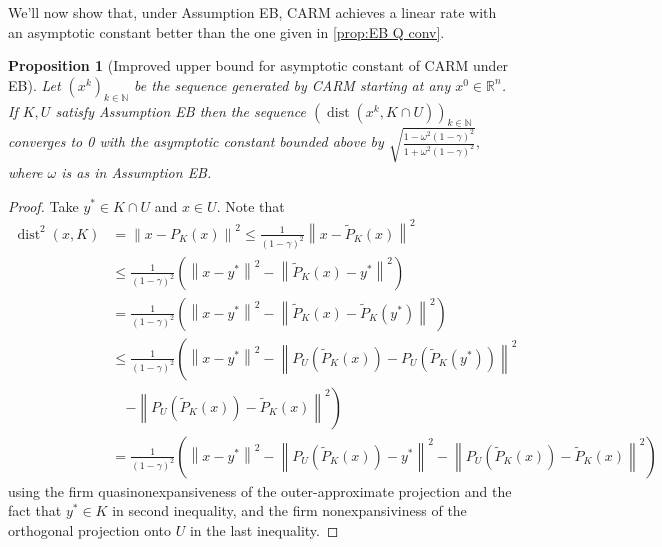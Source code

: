 \documentclass[smallextended,numbook,nospthms]{svjour3}
\theoremstyle{plain}
\newtheorem{proposition}[theorem]{Proposition}
\theoremstyle{definition}
\def\RR{\mathds R}
\def\NN{\mathds N}
\DeclareMathOperator{\dist}{dist}
\begin{document}
We'll now show that, under Assumption EB, CARM achieves a linear rate with an asymptotic constant better than the one given in \cref{prop:EB Q conv}.
\begin{proposition}[Improved upper bound for asymptotic constant of CARM under EB]\label{prop:CARM linear rate}
	Let $\left(x^{k}\right)_{k \in \NN}$ be the sequence generated by CARM starting at any $x^{0} \in \RR^{n}$. If $K, U$ satisfy Assumption EB then the sequence $\left(\dist\left(x^{k}, K \cap U\right)\right)_{k \in \NN}$ converges to 0 with the asymptotic constant bounded above by $\sqrt{\frac{1-\omega^{2}(1-\gamma)^2}{1+\omega^{2}(1-\gamma)^2}},$ where $\omega$ is as in Assumption EB.
\end{proposition}
\begin{proof}
	Take $y^{*} \in K \cap U$ and $x \in U$. Note that
	\begin{align}
		\dist^{2}(x, K) &=\left\|x-P_{K}(x)\right\|^{2}\leq \frac{1}{(1-\gamma)^2}\left\|x-\tilde{P}_{K}(x)\right\|^{2}  \\
		& \leq\frac{1}{(1-\gamma)^2}\left(\left\|x-y^{*}\right\|^{2}-\left\|\tilde{P}_{K}(x)-y^{*}\right\|^{2}\right) \\
		&=\frac{1}{(1-\gamma)^2}\left(\left\|x-y^{*}\right\|^{2}-\left\|\tilde{P}_{K}(x)-\tilde{P}_{K}\left(y^{*}\right)\right\|^{2}\right)  \\
		& \leq\frac{1}{(1-\gamma)^2}\left(\left\|x-y^{*}\right\|^{2}-\left\|P_{U}\left(\tilde{P}_{K}(x)\right)-P_{U}\left(\tilde{P}_{K}\left(y^{*}\right)\right)\right\|^{2}\right.\\
		&\quad\left.-\left\|P_{U}\left(\tilde{P}_{K}(x)\right)-\tilde{P}_{K}(x)\right\|^{2}\right)  \\
		&=\frac{1}{(1-\gamma)^2}\left(\left\|x-y^{*}\right\|^{2}-\left\|P_{U}\left(\tilde{P}_{K}(x)\right)-y^{*}\right\|^{2}-\left\|P_{U}\left(\tilde{P}_{K}(x)\right)-\tilde{P}_{K}(x)\right\|^{2}\right)\label{eq: dist^2(xK)}
	\end{align}
	using the firm quasinonexpansiveness of the outer-approximate projection and the fact that $y^{*} \in K$ in second inequality, and the firm nonexpansiviness of the orthogonal projection onto $U$ in the last inequality.
	

\end{proof}
\end{document}
